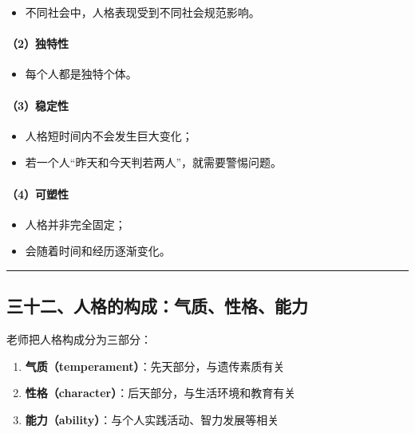 \documentclass[
  chinese,
  9pt,
  a4paper,
]{ctexart}
\providecommand{\tightlist}{%
  \setlength{\itemsep}{0pt}\setlength{\parskip}{0pt}}
\begin{document}
\begin{itemize}
\tightlist
\item
  不同社会中，人格表现受到不同社会规范影响。
\end{itemize}

\paragraph{（2）独特性}\label{ux72ecux7279ux6027}

\begin{itemize}
\tightlist
\item
  每个人都是独特个体。
\end{itemize}

\paragraph{（3）稳定性}\label{ux7a33ux5b9aux6027}

\begin{itemize}
\tightlist
\item
  人格短时间内不会发生巨大变化；
\item
  若一个人``昨天和今天判若两人''，就需要警惕问题。
\end{itemize}

\paragraph{（4）可塑性}\label{ux53efux5851ux6027}

\begin{itemize}
\tightlist
\item
  人格并非完全固定；
\item
  会随着时间和经历逐渐变化。
\end{itemize}

\begin{center}\rule{0.5\linewidth}{0.5pt}\end{center}

\subsection{三十二、人格的构成：气质、性格、能力}\label{ux4e09ux5341ux4e8cux4ebaux683cux7684ux6784ux6210ux6c14ux8d28ux6027ux683cux80fdux529b}

老师把人格构成分为三部分：

\begin{enumerate}
\def\labelenumi{\arabic{enumi}.}
\tightlist
\item
  \textbf{气质（temperament）}：先天部分，与遗传素质有关
\item
  \textbf{性格（character）}：后天部分，与生活环境和教育有关
\item
  \textbf{能力（ability）}：与个人实践活动、智力发展等相关
\end{enumerate}
\end{document}
